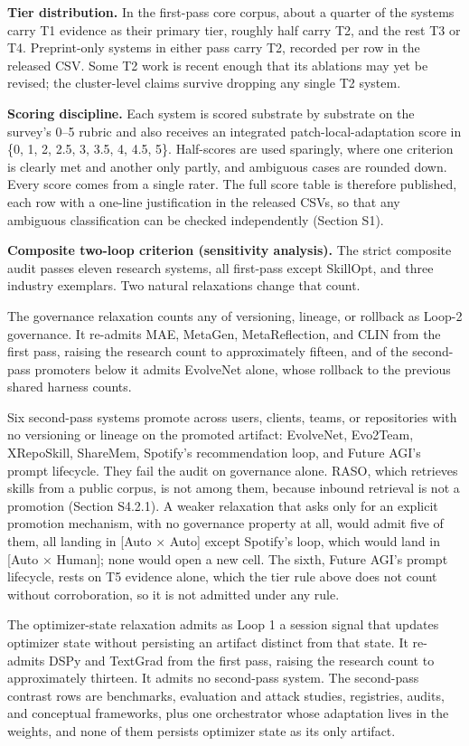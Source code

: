 \documentclass[
]{article}
\newcounter{none} %
\begin{document}
\textbf{Tier distribution.} In the first-pass core corpus, about a
quarter of the systems carry T1 evidence as their primary tier, roughly
half carry T2, and the rest T3 or T4. Preprint-only systems in either
pass carry T2, recorded per row in the released CSV. Some T2 work is
recent enough that its ablations may yet be revised; the cluster-level
claims survive dropping any single T2 system.

\textbf{Scoring discipline.} Each system is scored substrate by
substrate on the survey's 0--5 rubric and also receives an integrated
patch-local-adaptation score in \{0, 1, 2, 2.5, 3, 3.5, 4, 4.5, 5\}.
Half-scores are used sparingly, where one criterion is clearly met and
another only partly, and ambiguous cases are rounded down. Every score
comes from a single rater. The full score table is therefore published,
each row with a one-line justification in the released CSVs, so that any
ambiguous classification can be checked independently (Section S1).

\textbf{Composite two-loop criterion (sensitivity analysis).} The strict
composite audit passes eleven research systems, all first-pass except
SkillOpt, and three industry exemplars. Two natural relaxations change
that count.

The governance relaxation counts any of versioning, lineage, or rollback
as Loop-2 governance. It re-admits MAE, MetaGen, MetaReflection, and
CLIN from the first pass, raising the research count to approximately
fifteen, and of the second-pass promoters below it admits EvolveNet
alone, whose rollback to the previous shared harness counts.

Six second-pass systems promote across users, clients, teams, or
repositories with no versioning or lineage on the promoted artifact:
EvolveNet, Evo2Team, XRepoSkill, ShareMem, Spotify's recommendation
loop, and Future AGI's prompt lifecycle. They fail the audit on
governance alone. RASO, which retrieves skills from a public corpus, is
not among them, because inbound retrieval is not a promotion (Section
S4.2.1). A weaker relaxation that asks only for an explicit promotion
mechanism, with no governance property at all, would admit five of them,
all landing in {[}Auto × Auto{]} except Spotify's loop, which would land
in {[}Auto × Human{]}; none would open a new cell. The sixth, Future
AGI's prompt lifecycle, rests on T5 evidence alone, which the tier rule
above does not count without corroboration, so it is not admitted under
any rule.

The optimizer-state relaxation admits as Loop 1 a session signal that
updates optimizer state without persisting an artifact distinct from
that state. It re-admits DSPy and TextGrad from the first pass, raising
the research count to approximately thirteen. It admits no second-pass
system. The second-pass contrast rows are benchmarks, evaluation and
attack studies, registries, audits, and conceptual frameworks, plus one
orchestrator whose adaptation lives in the weights, and none of them
persists optimizer state as its only artifact.
\end{document}
